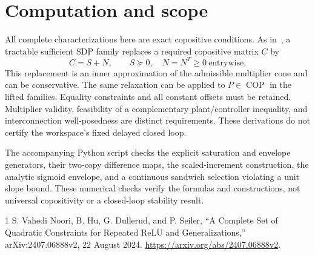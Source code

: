 \documentclass[10pt,a4paper]{article}
\theoremstyle{definition}
\theoremstyle{remark}
\newcommand{\COP}{\operatorname{COP}}
\begin{document}
\section{Computation and scope}
All complete characterizations here are exact copositive conditions. As in~\cite{relu}, a tractable sufficient SDP family replaces a required copositive matrix $C$ by
\[
 C=S+N,\qquad S\succeq0,\quad N=N^T\ge0\ \text{entrywise}.
\]
This replacement is an inner approximation of the admissible multiplier cone and can be conservative. The same relaxation can be applied to $P\in\COP$ in the lifted families. Equality constraints and all constant offsets must be retained. Multiplier validity, feasibility of a complementary plant/controller inequality, and interconnection well-posedness are distinct requirements. These derivations do not certify the workspace's fixed delayed closed loop.

The accompanying Python script checks the explicit saturation and envelope generators, their two-copy difference maps, the scaled-increment construction, the analytic sigmoid envelope, and a continuous sandwich selection violating a unit slope bound. These numerical checks verify the formulas and constructions, not universal copositivity or a closed-loop stability result.

\begin{thebibliography}{1}
 S. Vahedi Noori, B. Hu, G. Dullerud, and P. Seiler,
``A Complete Set of Quadratic Constraints for Repeated ReLU and Generalizations,''
arXiv:2407.06888v2, 22 August 2024.
\url{https://arxiv.org/abs/2407.06888v2}.
\end{thebibliography}
\end{document}
